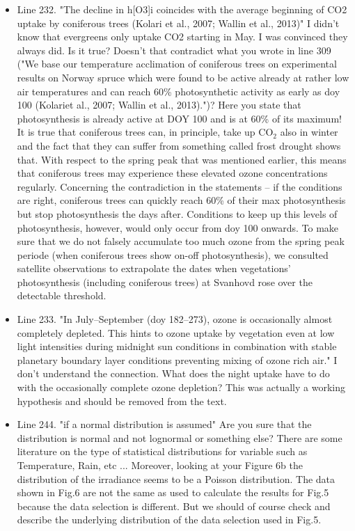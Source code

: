 \documentclass{scrartcl}
\begin{document}
\begin{itemize}
\item {\color{blue}Line 232. "The decline in h[O3]i coincides with the average beginning of CO2 uptake by coniferous trees (Kolari et al., 2007; Wallin et al., 2013)" I didn't know that evergreens only uptake CO2 starting in May. I was convinced they always did. Is it true? Doesn't that contradict what you wrote in line 309 ("We base our temperature acclimation of coniferous trees on experimental results on Norway spruce which were found to be active already at rather low air temperatures and can reach 60\% photosynthetic activity as early as doy 100 (Kolariet al., 2007; Wallin et al., 2013).")? Here you state that photosynthesis is already active at DOY 100 and is at 60\% of its maximum!}
It is true that coniferous trees can, in principle, take up $\mathrm{CO_2}$ also in winter and the fact that they can suffer from something called frost drought shows that. With respect to the spring peak that was mentioned earlier, this means that coniferous trees may experience these elevated ozone concentrations regularly. Concerning the contradiction in the statements -- if the conditions are right, coniferous trees can quickly reach 60\% of their max photosynthesis but stop photosynthesis the days after. Conditions to keep up this levels of photosynthesis, however, would only occur from doy 100 onwards. To make sure that we do not falsely accumulate too much ozone from the spring peak periode (when coniferous trees show on-off photosynthesis), we consulted satellite observations to extrapolate the dates when vegetations' photosynthesis (including coniferous trees) at Svanhovd rose over the detectable threshold.

\item {\color{blue}Line 233. "In July--September (doy 182--273), ozone is occasionally almost completely depleted. This hints to ozone uptake by vegetation even at low light intensities during midnight sun conditions in combination with stable planetary boundary layer conditions preventing mixing of ozone rich air."
I don't understand the connection. What does the night uptake have to do with the
occasionally complete ozone depletion?} This was actually a working hypothesis and should be removed from the text.

\item {\color{blue}Line 244. "if a normal distribution is assumed" 
Are you sure that the distribution is normal and not lognormal or something else? There are some literature on the type of statistical distributions for variable such as Temperature, Rain, etc ...
Moreover, looking at your Figure 6b the distribution of the irradiance seems to be a
Poisson distribution.}
The data shown in Fig.6 are not the same as used to calculate the results for Fig.5 because the data selection is different. But we should of course check and describe the underlying distribution of the data selection used in Fig.5.


\end{itemize}
\end{document}
